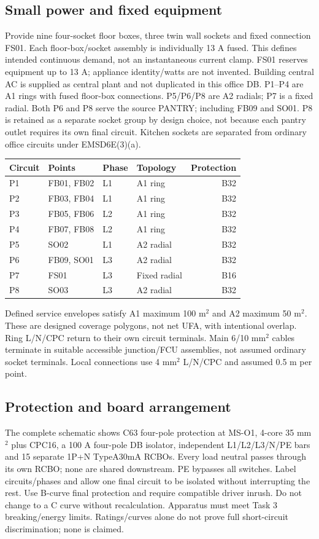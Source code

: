 \documentclass[11pt,a4paper]{article}
\begin{document}
\subsection*{Small power and fixed equipment}
Provide nine four-socket floor boxes, three twin wall sockets and fixed connection FS01. Each floor-box/socket assembly is individually 13 A fused. This defines intended continuous demand, not an instantaneous current clamp. FS01 reserves equipment up to 13 A;  appliance identity/watts are not invented. Building central AC is supplied as central plant and not duplicated in this office DB.
P1--P4 are A1 rings with fused floor-box connections. P5/P6/P8 are A2 radials;  P7 is a fixed radial. Both P6 and P8 serve the source PANTRY;  including FB09 and SO01. P8 is retained as a separate socket group by design choice, not because each pantry outlet requires its own final circuit. Kitchen sockets are separated from ordinary office circuits under EMSD6E(3)(a).
\begin{center}\begin{tabular}{llllr}\toprule
Circuit & Points & Phase & Topology & Protection\\\midrule

P1 & FB01, FB02 & L1 & A1 ring & B32 \\
P2 & FB03, FB04 & L1 & A1 ring & B32 \\
P3 & FB05, FB06 & L2 & A1 ring & B32 \\
P4 & FB07, FB08 & L2 & A1 ring & B32 \\
P5 & SO02 & L1 & A2 radial & B32 \\
P6 & FB09, SO01 & L3 & A2 radial & B32 \\
P7 & FS01 & L3 & Fixed radial & B16 \\
P8 & SO03 & L3 & A2 radial & B32 \\

\bottomrule\end{tabular}\end{center}
Defined service envelopes satisfy A1 maximum 100 m$^2$ and A2 maximum 50 m$^2$. These are designed coverage polygons, not net UFA, with intentional overlap. Ring L/N/CPC return to their own circuit terminals. Main 6/10 mm$^2$ cables terminate in suitable accessible junction/FCU assemblies, not assumed ordinary socket terminals. Local connections use 4 mm$^2$ L/N/CPC and assumed 0.5 m per point.
\subsection*{Protection and board arrangement}
The complete schematic shows C63 four-pole protection at MS-O1, 4-core 35 mm$^2$ plus CPC16, a 100 A four-pole DB isolator, independent L1/L2/L3/N/PE bars and 15 separate 1P+N TypeA30mA RCBOs. Every load neutral passes through its own RCBO;  none are shared downstream. PE bypasses all switches. Label circuits/phases and allow one final circuit to be isolated without interrupting the rest.
Use B-curve final protection and require compatible driver inrush. Do not change to a C curve without recalculation. Apparatus must meet Task 3 breaking/energy limits. Ratings/curves alone do not prove full short-circuit discrimination;  none is claimed.
\end{document}
